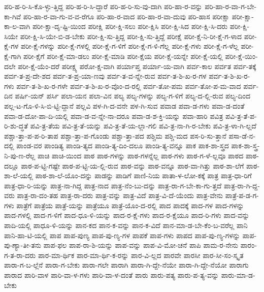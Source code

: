 {ಪರಿ-ಹ-ರಿ-ಸಿ-ಕೊ-ಳ್ಳು-ತ್ತಿದ್ದ
ಪರಿ-ಹ-ರಿ-ಸಿ-ದ್ದಾರೆ
ಪರಿ-ಹ-ರಿ-ಸು-ವು-ದಾಗಿ
ಪರಿ-ಹಾ-ರ-ವನ್ನು
ಪರಿ-ಹಾ-ರ-ವಾ-ಗ-ಬೇ-ಕಾ-ಗಿವೆ
ಪರಿ-ಹಾ-ರ-ವಾ-ಗು-ವ-ವ-ರೆಗೂ
ಪರಿ-ಹಾ-ರ-ವಾದ
ಪರಿ-ಹಾ-ರ-ವಾ-ದುವು
ಪರಿ-ಹಾಸ
ಪರೀಕ್ಷಾ
ಪರೀ-ಕ್ಷಾ-ಕಾ-ಲ-ವಾಗಿ
ಪರೀ-ಕ್ಷಾ-ದೃ-ಷ್ಟಿ-ಯಿಂದ
ಪರೀಕ್ಷಿ
ಪರೀ-ಕ್ಷಿ-ಸಲು
ಪರೀ-ಕ್ಷಿಸಿ
ಪರೀ-ಕ್ಷಿ-ಸಿದ
ಪರೀ-ಕ್ಷಿ-ಸಿ-ದರು
ಪರೀ-ಕ್ಷಿ-ಸಿಯೇ
ಪರೀ-ಕ್ಷಿ-ಸಿ-ಯೇ-ಬಿ-ಡ-ಬೇಕು
ಪರೀ-ಕ್ಷಿ-ಸು-ತ್ತಿದ್ದ
ಪರೀ-ಕ್ಷಿ-ಸು-ತ್ತಿದ್ದೆ
ಪರೀಕ್ಷೆ
ಪರೀ-ಕ್ಷೆ-ನಿ-ರೀ-ಕ್ಷೆ-ಗ-ಳಾದ
ಪರೀ-ಕ್ಷೆ-ಗಳ
ಪರೀ-ಕ್ಷೆ-ಗಳನ್ನು
ಪರೀ-ಕ್ಷೆ-ಗಳಲ್ಲಿ
ಪರೀ-ಕ್ಷೆ-ಗ-ಳಿಗೆ
ಪರೀ-ಕ್ಷೆ-ಗ-ಳಿ-ಗೆಲ್ಲ
ಪರೀ-ಕ್ಷೆ-ಗಳು
ಪರೀ-ಕ್ಷೆ-ಗ-ಳೆಲ್ಲ
ಪರೀ-ಕ್ಷೆ-ಗಾಗಿ
ಪರೀ-ಕ್ಷೆಗೆ
ಪರೀ-ಕ್ಷೆ-ಮಾ-ಡಲು
ಪರೀ-ಕ್ಷೆ-ಮಾಡಿ
ಪರೀ-ಕ್ಷೆಯ
ಪರೀ-ಕ್ಷೆ-ಯನ್ನೇ
ಪರೀ-ಕ್ಷೆ-ಯಲ್ಲಿ
ಪರೀ-ಕ್ಷೆ-ಯಿಂ-ದಲೇ
ಪರೀ-ಕ್ಷೆ-ಯೆಂ-ದರೆ
ಪರೀಕ್ಷ್ಯ
ಪರೋ-ಕ್ಷ-ವಾಗಿ
ಪರ್ಯಾಪ್ತ
ಪರ್ಯಾ-ಯ-ವಾಗಿ
ಪರ್ವ-ಕಾಲ
ಪರ್ವತ
ಪರ್ವ-ತಕ್ಕೆ
ಪರ್ವ-ತ-ಪ್ರ-ದೇ-ಶದ
ಪರ್ವ-ತ-ಪ್ರ-ಯಾ-ಣವು
ಪರ್ವ-ತ-ವ-ನ್ನೇ-ರುವ
ಪರ್ವ-ತ-ಶಿ-ಖ-ರ-ಗಳ
ಪರ್ವ-ತ-ಶಿ-ಖ-ರ-ಗಳು
ಪರ್ವ-ತ-ಶಿ-ಖ-ರ-ಗಳೇ
ಪರ್ವ-ತ-ಶಿ-ಖ-ರ-ವೊಂ-ದ-ರಲ್ಲಿ
ಪರ್ವ-ತೋ-ಪಮ
ಪರ್ವ-ತೋ-ಪ-ಮ-ವಾದ
ಪರ್ವ-ದಿನ
ಪರ್ಷಿ-ಯನ್
ಪರ್ಸಿ
ಪಲಾ-ಯನ
ಪಲಾ-ವಿನ
ಪಲ್ಯ
ಪಲ್ಯ-ಗಳನ್ನು
ಪಲ್ಯ-ಗ-ಳಿಗೆ
ಪಲ್ಯ-ದ-ಲ್ಲಿ-ರುವ
ಪಲ್ಯ-ದಿಂದ
ಪಲ್ಲ-ಟ-ಗೊ-ಳಿ-ಸಿ-ಬಿ-ಟ್ಟಿ-ದ್ದಾನೆ
ಪಲ್ಲವಿ
ಪಳ-ಗಿ-ದ-ವನೇ
ಪಳ-ಗಿ-ಸುವ
ಪವಾಡ
ಪವಾ-ಡ-ಗಳು
ಪವಾ-ಡ-ದಂತೆ
ಪವಾ-ಡ-ದೋ-ಪಾ-ದಿ-ಯಲ್ಲಿ
ಪವಾ-ಡ-ವ-ನ್ನೇ-ನಾ-ದರೂ
ಪವಾ-ಡ-ಶ-ಕ್ತಿ-ಯನ್ನು
ಪವಾ-ಹಾರಿ
ಪವಿತ್ರ
ಪವಿ-ತ್ರ-ತೆ-ಪ-ರಿ-ಶು-ದ್ಧತೆ
ಪವಿ-ತ್ರ-ತೆಯ
ಪವಿ-ತ್ರ-ತೆ-ಯನ್ನು
ಪವಿ-ತ್ರ-ತೆ-ಯ-ಲ್ಲಾ-ಗಲಿ
ಪವಿ-ತ್ರ-ನಾ-ಗಿ-ರ-ಬೇಕು
ಪವಿ-ತ್ರ-ಳಾ-ಗಿ-ಲ್ಲದೆ
ಪಶ್ಚಾ-ತ್ತಾ-ಪ-ಪ-ರಿ-ತಾಪ
ಪಶ್ಚಾ-ತ್ತಾ-ಪ-ಗೊಂಡು
ಪಶ್ಚಾ-ತ್ತಾ-ಪದ
ಪಶ್ಚಿಮ
ಪಶ್ಚಿ-ಮದ
ಪಸ-ರಿ-ಸು-ತ್ತಾನೆ
ಪಸಾ-ಡೆ-ನ-ದಲ್ಲಿ
ಪಾಂಡ-ವರ
ಪಾಂಡಿತ್ಯ
ಪಾಂಡಿ-ತ್ಯದ
ಪಾಂಡಿ-ತ್ಯ-ದಿಂ-ದಲೂ
ಪಾಂಡಿ-ತ್ಯ-ವನ್ನೂ
ಪಾಕ
ಪಾಕ-ಶಾ-ಸ್ತ್ರದ
ಪಾಕ-ಶಾ-ಸ್ತ್ರ-ನಿ-ಪು-ಣ-ರೆಲ್ಲ
ಪಾಚಿ
ಪಾಚಿ-ಯಿಂದ
ಪಾಠ
ಪಾಠ-ಗಳನ್ನು
ಪಾಠ-ಗಳನ್ನೆಲ್ಲ
ಪಾಠ-ಗಳು
ಪಾಠ-ಗ-ಳೆ-ಲ್ಲವೂ
ಪಾಠದ
ಪಾಠ-ದಲ್ಲೂ
ಪಾಠ-ಪ-ಟ್ಟಿ-ಗಷ್ಟೇ
ಪಾಠ-ಪ-ಟ್ಟಿ-ಯ-ಲ್ಲಿ-ರುವ
ಪಾಠ-ವನ್ನು
ಪಾಠ-ವನ್ನೂ
ಪಾಠ-ವಾ-ಗಿತ್ತು
ಪಾಠ-ಶಾ-ಲೆಗೆ
ಪಾಠ-ಶಾ-ಲೆ-ಯಲ್ಲಿ
ಪಾಠ-ಶಾ-ಲೆ-ಯೊಂ-ದನ್ನು
ಪಾಡನ್ನು
ಪಾಡಿಗೆ
ಪಾಣಿ-ನಿಯ
ಪಾತಾ-ಳ-ಲೋ-ಕಕ್ಕೆ
ಪಾತ್ರ
ಪಾತ್ರ-ಧಾ-ರಿಗೆ
ಪಾತ್ರ-ಧಾ-ರಿ-ಯನ್ನು
ಪಾತ್ರ-ನಾ-ಗಿದ್ದ
ಪಾತ್ರ-ನಾದ
ಪಾತ್ರ-ನೆಂ-ಬು-ದನ್ನು
ಪಾತ್ರ-ರಾ-ಗ-ಬೇ-ಕಾ-ಗು-ತ್ತದೆ
ಪಾತ್ರ-ರಾ-ಗಿ-ದ್ದ-ವರು
ಪಾತ್ರ-ರಾ-ದಂ-ತಹ
ಪಾತ್ರ-ರಾ-ದರು
ಪಾತ್ರ-ವನ್ನು
ಪಾತ್ರ-ವಿದೆ
ಪಾತ್ರ-ವಿ-ದೆ-ಯೆಂದು
ಪಾತ್ರ-ವೇನು
ಪಾತ್ರೆ-ಪ-ಡ-ಗ-ಗಳು
ಪಾತ್ರೆಗೆ
ಪಾತ್ರೆಯ
ಪಾತ್ರೆ-ಯನ್ನು
ಪಾತ್ರೆಯೂ
ಪಾತ್ರೆ-ಯೊಂ-ದ-ರಲ್ಲಿ
ಪಾದ
ಪಾದಕ್ಕೆ
ಪಾದ-ಗಳ
ಪಾದ-ಗಳನ್ನು
ಪಾದ-ಗಳಲ್ಲಿ
ಪಾದ-ಗ-ಳಿಗೆ
ಪಾದ-ಧೂ-ಳಿ-ಯನ್ನು
ಪಾದ-ರ-ಕ್ಷೆ-ಗಳು
ಪಾದ-ರ-ಕ್ಷೆಯೂ
ಪಾದ-ರಿ-ಗಳು
ಪಾದ-ವನ್ನು
ಪಾದಿ-ಯಲ್ಲಿ
ಪಾಧೂ-ಳಿ-ಯನ್ನು
ಪಾನ-ಕದ
ಪಾನ-ಕ-ವನ್ನು
ಪಾನ-ಕ-ವಿದೆ
ಪಾನ-ಮಾ-ಡ-ಬೇ-ಕೆಂ-ಬ-ವರೆಲ್ಲ
ಪಾನಿ
ಪಾನಿ-ಹಾ-ಟಿ-ಯಲ್ಲಿ
ಪಾಪ
ಪಾಪ-ಪುಣ್ಯ
ಪಾಪ-ಪು-ಣ್ಯ-ಗಳ
ಪಾಪಕೆ
ಪಾಪ-ಗಳು
ಪಾಪದ
ಪಾಪ-ಪು-ಣ್ಯ-ಗಳನ್ನು
ಪಾಪ-ಪು-ಣ್ಯಾ-ತೀ-ತನು
ಪಾಪ-ಫಲ
ಪಾಪ-ರಾ-ಶಿ-ಯನ್ನು
ಪಾಪ-ವನ್ನು
ಪಾಪ-ವಿ-ಮೋ-ಚನೆ
ಪಾಪಿ
ಪಾಮ-ರ-ನೇನು
ಪಾರಂ-ಗ-ತ-ರಾ-ದರು
ಪಾರ-ಮಾ-ರ್ಥಿಕ
ಪಾರ-ಮಾ-ರ್ಥಿ-ಕ-ರನ್ನು
ಪಾರ-ವಿ-ಲ್ಲದ
ಪಾರವೇ
ಪಾರಸೀ
ಪಾರ-ಸೀ-ಸಂ-ಸ್ಕೃತ
ಪಾರಾ-ಗ-ಬ-ಲ್ಲೆನೆ
ಪಾರಾ-ಗ-ಬೇಕು
ಪಾರಾ-ಗಲೇ
ಪಾರಾಗಿ
ಪಾರಾ-ಗಿ-ದ್ದೇ-ನೆಯೇ
ಪಾರಾ-ಗಿ-ದ್ದೇ-ನೆಯೋ
ಪಾರಾಗು
ಪಾರಾದ
ಪಾರಿ-ವಾಳ
ಪಾರಿ-ವಾ-ಳ-ಗಳು
ಪಾರಿ-ವಾ-ಳ-ದಂತೆ
ಪಾರು
ಪಾರು-ಪತ್ಯ
ಪಾರು-ಪ-ತ್ಯ-ವನ್ನು
ಪಾರು-ಮಾ-ಡ-ಬೇಕು
}
